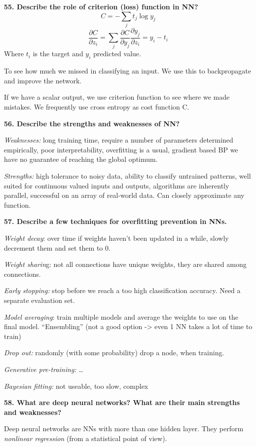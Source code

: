 \textbf{55. Describe the role of criterion (loss) function in
NN?}
\[C = -\sum_j t_j \log y_j \]
\[ \frac{\partial C}{\partial z_i} = \sum_j\frac{\partial C}{\partial y_j} \frac{\partial y_j}{\partial z_i} = y_i - t_i \]
Where $t_i$ is the target and $y_i$ predicted value.

To see how much we missed in classifying an input. We use this to
backpropagate and improve the network.

If we have a scalar output, we use criterion function to see where we
made mistakes. We frequently use cross entropy as cost function C.

\textbf{56. Describe the strengths and weaknesses of NN?}

\textit{Weaknesses:} long training time, require a number of
parameters determined empirically, poor interpretability, overfitting is
a usual, gradient based BP we have no guarantee of reaching the global
optimum.

\textit{Strengths:} high tolerance to noisy data, ability to classify
untrained patterns, well suited for continuous valued inputs and
outputs, algorithms are inherently parallel, successful on an array of
real-world data. Can closely approximate any function.

\textbf{57. Describe a few techniques for overfitting prevention in
NNs.}

\textit{Weight decay}: over time if weights haven't been updated in a
while, slowly decrement them and set them to 0.

\textit{Weight sharin}g: not all connections have unique weights,
they are shared among connections.

\textit{Early stopping:} stop before we reach a too high
classification accuracy. Need a separate evaluation set.

\textit{Model averaging}: train multiple models and average the
weights to use on the final model. ``Ensembling'' (not a good option
-\textgreater{} even 1 NN takes a lot of time to train)

\textit{Drop out:} randomly (with some probability) drop a node, when
training.

\textit{Generative pre-training:} \ldots{}

\textit{Bayesian fitting:} not useable, too slow, complex

\textbf{58. What are deep neural networks? What are their main strengths
and weaknesses?}

Deep neural networks are NNs with more than one hidden layer. They
perform \textit{nonlinear regression} (from a statistical point of view).

